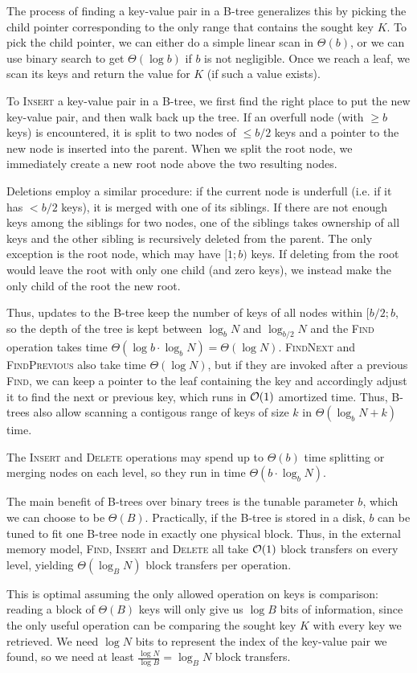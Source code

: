 The process of finding a key-value pair in a B-tree generalizes this
by picking the child pointer corresponding to the only range that contains
the sought key $K$. To pick the child pointer, we can either do a simple
linear scan in $\Theta(b)$, or we can use binary search to get
$\Theta(\log b)$ if $b$ is not negligible.
Once we reach a leaf, we scan its keys and return the value for $K$
(if such a value exists).

To \textsc{Insert} a key-value pair in a B-tree, we first find the right
place to put the new key-value pair, and then walk back up the tree.
If an overfull node (with $\geq b$ keys) is encountered, it is split
to two nodes of $\leq b/2$ keys and a pointer to the new node is inserted into
the parent. When we split the root node, we immediately create a new
root node above the two resulting nodes.

Deletions employ a similar procedure: if the current node is underfull
(i.e. if it has $< b/2$ keys), it is merged with one of its siblings.
If there are not enough keys among the siblings for two nodes,
one of the siblings takes ownership of all keys and the other sibling
is recursively deleted from the parent.
The only exception is the root node, which may have $[1;b)$ keys.
If deleting from the root would leave the root with only one child
(and zero keys), we instead make the only child of the root the new root.

Thus, updates to the B-tree keep the number of keys of all nodes within
$[b/2;b$, so the depth of the tree is kept between $\log_b N$ and
$\log_{b/2} N$ and the \textsc{Find} operation takes time
$\Theta(\log b \cdot \log_b N)=\Theta(\log N)$. \textsc{FindNext} and
\textsc{FindPrevious} also take time $\Theta(\log N)$, but if they are invoked
after a previous \textsc{Find}, we can keep a pointer to the leaf containing
the key and accordingly adjust it to find the next or previous key, which runs
in $\mathcal{O}(1)$ amortized time. Thus, B-trees also allow scanning a contigous
range of keys of size $k$ in $\Theta(\log_b N + k)$ time.

The \textsc{Insert} and \textsc{Delete} operations may spend up to
$\Theta(b)$ time splitting or merging nodes on each level, so they run in
time $\Theta(b \cdot \log_b N)$.

The main benefit of B-trees over binary trees is the tunable parameter
$b$, which we can choose to be $\Theta(B)$. Practically, if the B-tree
is stored in a disk, $b$ can be tuned to fit one B-tree node in exactly one
physical block. Thus, in the external memory model, \textsc{Find},
\textsc{Insert} and \textsc{Delete} all take $\mathcal{O}(1)$ block transfers
on every level, yielding $\Theta(\log_B N)$ block transfers per operation.

This is optimal assuming the only allowed operation
on keys is comparison: reading a block of $\Theta(B)$ keys will only
give us $\log B$ bits of information, since the only useful operation
can be comparing the sought key $K$ with every key we retrieved.
We need $\log N$ bits to represent the index of the key-value pair we found,
so we need at least $\frac{\log N}{\log B}=\log_B N$ block transfers.
